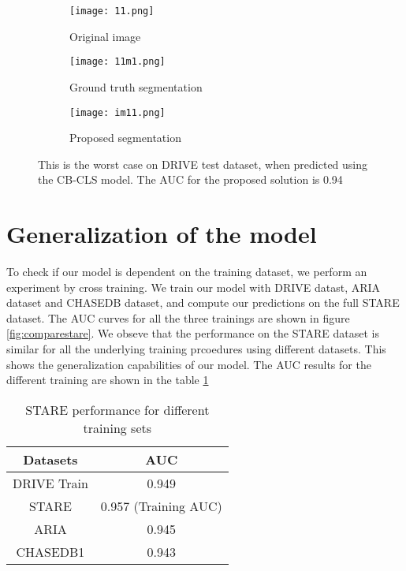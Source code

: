 \begin{figure}
	\centering
	\begin{subfigure}[b]{0.3\textwidth}
		\texttt{[image: 11.png]}
		\caption{Original image}
		\label{fig:111}
	\end{subfigure}
	\begin{subfigure}[b]{0.3\textwidth}
		\texttt{[image: 11m1.png]}
		\caption{Ground truth segmentation}
		\label{fig:112}
	\end{subfigure}
	\begin{subfigure}[b]{0.3\textwidth}
		\texttt{[image: im11.png]}
		\caption{Proposed segmentation}
		\label{fig:113}
	\end{subfigure}
	\caption[Worst case on DRIVE test dataset using cluster learning]{This is the worst case on DRIVE test dataset, when predicted using the CB-CLS model. The AUC for the proposed solution is 0.94}
	\label{fig:worstcase}
\end{figure}

\section{Generalization of the model}\label{sec:generalization}
To check if our model is dependent on the training dataset, we perform an experiment by cross training. We train our model with DRIVE datast, ARIA dataset and CHASEDB dataset, and compute our predictions on the full STARE dataset.
The AUC curves for all the three trainings are shown in figure \ref{fig:comparestare}. We obseve that the performance on the STARE dataset is similar for all the underlying training prcoedures using different datasets. This shows the generalization capabilities of our model. The AUC results for the different training are shown in the table \ref{table:auccompare}

\begin{table}
	\caption{STARE performance for different training sets}
	\centering
	\label{table:auccompare}
	\begin{tabular}{c c  }
		\toprule
		{Datasets} & {AUC}   \\ \hline
		
		DRIVE Train & 0.949 \\
		
		STARE& 0.957 (Training AUC)  \\
		
		ARIA & 0.945 \\
		
		CHASEDB1 & 0.943 \\
		
		\bottomrule
	\end{tabular}
\end{table}



